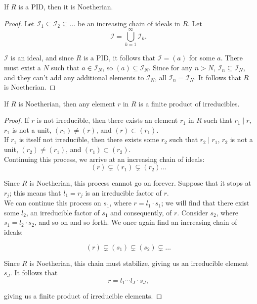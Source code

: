 \documentclass[11pt]{article}
\begin{document}
\begin{theorem}
If $R$ is a PID, then it is Noetherian.
\end{theorem}

\begin{proof}
Let $\mathcal{I}_1 \subseteq \mathcal{I}_2 \subseteq  \dots$ be an increasing chain of ideals in $R$. Let
\[
    \mathcal{I} = \bigcup_{k=1}^{\infty} \mathcal{I}_k.
\]

$\mathcal{I}$ is an ideal, and since $R$ is a PID, it follows that $\mathcal{I} = (a)$ for some $a$. 
There must exist a $N$ such that $a \in \mathcal{I}_N$, so $(a) \subseteq \mathcal{I}_N$. 
Since for any $n > N$, $\mathcal{I}_n \subseteq \mathcal{I}_N$, and they can't add any additional elements to $\mathcal{I}_N$, all $\mathcal{I}_n = \mathcal{I}_N$. 
It follows that $R$ is Noetherian. 
\end{proof}

\begin{lemma}
If $R$ is Noetherian, then any element $r$ in $R$ is a finite product of irreducibles.
\end{lemma}

\begin{proof}
If $r$ is not irreducible, then there exists an element $r_1$ in $R$ such that $r_1 \mid r$, $r_1$ is not a unit, $(r_1) \neq (r)$, and $(r) \subset (r_1)$. \\

If $r_1$ is itself not irreducible, then there exists some $r_2$ such that $r_2 \mid r_1$, $r_2$ is not a unit, $(r_2) \neq (r_1)$, and $(r_1) \subset (r_2)$. \\

Continuing this process, we arrive at an increasing chain of ideals:
\[
    (r) \subsetneq (r_1) \subsetneq (r_2) \dots
\]

Since $R$ is Noetherian, this process cannot go on forever. Suppose that it stops at $r_j$; this means that $l_1 = r_j$ is an irreducible factor of $r$. \\

We can continue this process on $s_1$, where $r = l_1 \cdot s_1$; we will find that there exist some $l_2$, an irreducible factor of $s_1$ and consequently, of $r$. 
Consider $s_2$, where $s_1 = l_2 \cdot s_2$, and so on and so forth. We once again find an increasing chain of ideals:

\[
    (r) \subsetneq (s_1) \subsetneq (s_2) \subsetneq \dots
\]

Since $R$ is Noetherian, this chain must stabilize, giving us an irreducible element $s_J$. It follows that
\[
    r = l_1 \cdots l_J \cdot s_J,
\]

giving us a finite product of irreducible elements.
\end{proof}
\end{document}
